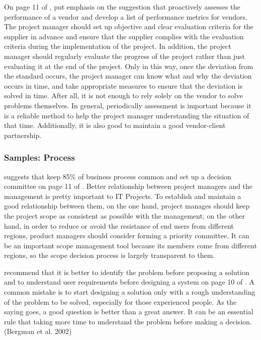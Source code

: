 On page 11 of , \citeauthor{2} put emphasis on the suggestion that proactively assesses the performance of a vendor and develop a list of performance metrics for vendors. The project manager should set up objective and clear evaluation criteria for the supplier in advance and ensure that the supplier complies with the evaluation criteria during the implementation of the project. In addition, the project manager should regularly evaluate the progress of the project rather than just evaluating it at the end of the project. Only in this way, once the deviation from the standard occurs, the project manager can know what and why the deviation occurs in time, and take appropriate measures to ensure that the deviation is solved in time. After all, it is not enough to rely solely on the vendor to solve problems themselves. In general, periodically assessment is important because it is a reliable method to help the project manager understanding the situation of that time. Additionally, it is also good to maintain a good vendor-client partnership.

\subsubsection{Samples: Process}
\citeauthor{2} suggests that keep 85\% of business process common and set up a decision committee on page 11 of . Better relationship between project managers and the management is pretty important to IT Projects. To establish and maintain a good relationship between them, on the one hand, project manages should keep the project scope as consistent as possible with the management; on the other hand, in order to reduce or avoid the resistance of end users from different regions, product managers should consider forming a priority committee. It can be an important scope management tool because its members come from different regions, so the scope decision process is largely transparent to them.

\citeauthor{6} recommend that it is better to identify the problem before proposing a solution and to understand user requirements before designing a system on page 10 of . A common mistake is to start designing a solution only with a rough understanding of the problem to be solved, especially for those experienced people. As the saying goes, a good question is better than a great answer. It can be an essential rule that taking more time to understand the problem before making a decision. (Bergman et al. 2002)

